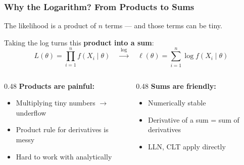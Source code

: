 \documentclass[aspectratio=169]{beamer}
\begin{document}
\begin{frame}
\frametitle{Why the Logarithm? From Products to Sums}

\small
The likelihood is a product of $n$ terms --- and those terms can be tiny.

\vspace{0.1cm}
Taking the log turns this \textbf{product into a sum}:
$$L(\theta) = \prod_{i=1}^n f(X_i \mid \theta) \quad\xrightarrow{\;\log\;}\quad \ell(\theta) = \sum_{i=1}^n \log f(X_i \mid \theta)$$

\vspace{0.1cm}
\begin{columns}[T]
\begin{column}{0.48\textwidth}
\textcolor{sampred}{\textbf{Products are painful:}}
\begin{itemize}\setlength{\itemsep}{2pt}
  \small
  \item Multiplying tiny numbers $\to$ underflow
  \item Product rule for derivatives is messy
  \item Hard to work with analytically
\end{itemize}
\end{column}
\begin{column}{0.48\textwidth}
\textcolor{paramgreen}{\textbf{Sums are friendly:}}
\begin{itemize}\setlength{\itemsep}{2pt}
  \small
  \item Numerically stable
  \item Derivative of a sum = sum of derivatives
  \item LLN, CLT apply directly
\end{itemize}
\end{column}
\end{columns}

\vspace{0.2cm}
\begin{center}
\end{center}
\end{frame}
\end{document}
